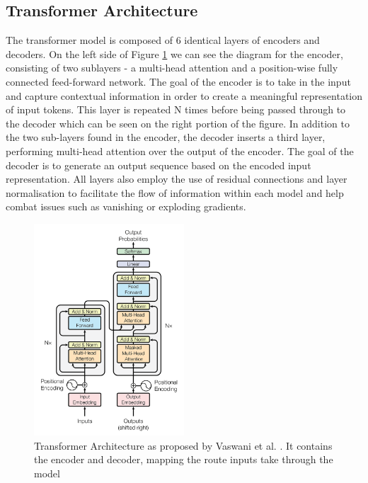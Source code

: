 \subsection{Transformer Architecture}

The transformer model is composed of 6 identical layers of encoders and decoders. On the left side of Figure \ref{fig:transformer_arch} we can see the diagram for the encoder, consisting of two sublayers - a multi-head attention and a position-wise fully connected feed-forward network. The goal of the encoder is to take in the input and capture contextual information in order to create a meaningful representation of input tokens. This layer is repeated N times before being passed through to the decoder which can be seen on the right portion of the figure. In addition to the two sub-layers found in the encoder, the decoder inserts a third layer, performing multi-head attention over the output of the encoder. The goal of the decoder is to generate an output sequence based on the encoded input representation. All layers also employ the use of residual connections and layer normalisation to facilitate the flow of information within each model and help combat issues such as vanishing or exploding gradients.

\begin{figure}[H]
    \centering
    \includegraphics[width=0.5\textwidth]{graphs/transformer_architecture.png}
    \caption{Transformer Architecture as proposed by Vaswani et al. \cite{transformer_paper}. It contains the encoder and decoder, mapping the route inputs take through the model}
    \label{fig:transformer_arch}
\end{figure}

